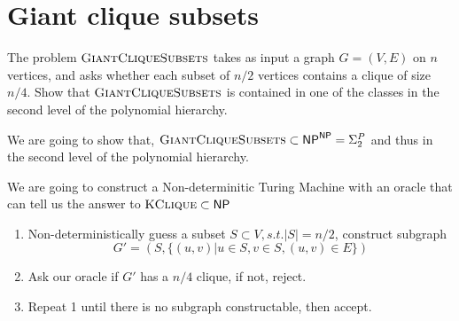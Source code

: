 

\maketitle
\thispagestyle{firststyle}
\vspace{-2.0cm}

\section*{Giant clique subsets}
    The problem $\textsc{GiantCliqueSubsets}$ takes as input a graph $G = (V,E)$ on $n$ vertices, and asks whether each subset of $n/2$ vertices contains a clique of size $n/4$. Show that $\textsc{GiantCliqueSubsets}$ is contained in one of the classes in the second level of the polynomial hierarchy.
 
We are going to show that, $\textsc{GiantCliqueSubsets} \subset \mathsf{NP}^{\mathsf{NP}} = \Sigma_2^P$ and thus in the second level of the polynomial hierarchy.

We are going to construct a Non-determinitic Turing Machine with an oracle that can tell us the answer to $\textsc{KClique} \subset \mathsf{NP}$

\begin{enumerate}
    \item Non-deterministically guess a subset $S \subset V, s.t. |S| = n/2$, 
    construct subgraph $$G' = (S, \{(u, v) | u \in S, v \in S, (u, v) \in E\})$$
    \item Ask our oracle if $G'$ has a $n/4$ clique, if not, reject.
    \item Repeat 1 until there is no subgraph constructable, then accept.
\end{enumerate}



